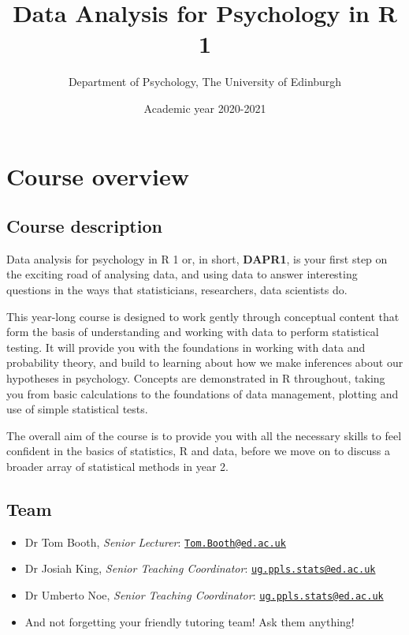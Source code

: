 \documentclass[12pt,]{krantz}
\title{Data Analysis for Psychology in R 1}
\author{Department of Psychology, The University of Edinburgh}
\date{Academic year 2020-2021}
\providecommand{\tightlist}{%
  \setlength{\itemsep}{0pt}\setlength{\parskip}{0pt}}
\begin{document}
\maketitle

{
\hypersetup{linkcolor=}
\setcounter{tocdepth}{2}
\tableofcontents
}
\listoftables
\listoffigures
\hypertarget{chap-overview}{%
\section*{Course overview}\label{chap-overview}}

\hypertarget{course-description}{%
\subsection*{Course description}\label{course-description}}

Data analysis for psychology in R 1 or, in short, \textbf{DAPR1}, is your first step on the exciting road of analysing data, and using data to answer interesting questions in the ways that statisticians, researchers, data scientists do.

This year-long course is designed to work gently through conceptual content that form the basis of understanding and working with data to perform statistical testing. It will provide you with the foundations in working with data and probability theory, and build to learning about how we make inferences about our hypotheses in psychology. Concepts are demonstrated in R throughout, taking you from basic calculations to the foundations of data management, plotting and use of simple statistical tests.

The overall aim of the course is to provide you with all the necessary skills to feel confident in the basics of statistics, R and data, before we move on to discuss a broader array of statistical methods in year 2.

\hypertarget{team}{%
\subsection*{Team}\label{team}}

\begin{itemize}
\tightlist
\item
  Dr Tom Booth, \emph{Senior Lecturer}: \href{mailto:Tom.Booth@ed.ac.uk}{\nolinkurl{Tom.Booth@ed.ac.uk}}
\item
  Dr Josiah King, \emph{Senior Teaching Coordinator}: \href{mailto:ug.ppls.stats@ed.ac.uk}{\nolinkurl{ug.ppls.stats@ed.ac.uk}}
\item
  Dr Umberto Noe, \emph{Senior Teaching Coordinator}: \href{mailto:ug.ppls.stats@ed.ac.uk}{\nolinkurl{ug.ppls.stats@ed.ac.uk}}
\item
  And not forgetting your friendly tutoring team! Ask them anything!
\end{itemize}
\end{document}
